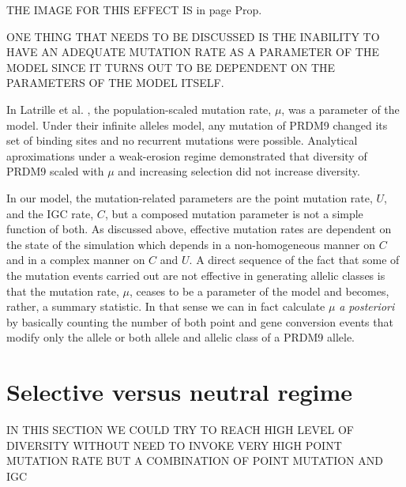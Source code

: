 \documentclass[a4paper,10pt]{article}
\begin{document}
THE IMAGE FOR THIS EFFECT IS in page Prop.

ONE THING THAT NEEDS TO BE DISCUSSED IS THE INABILITY TO HAVE AN ADEQUATE MUTATION RATE AS A PARAMETER OF THE MODEL SINCE IT TURNS OUT TO BE DEPENDENT ON THE PARAMETERS OF THE MODEL ITSELF. 

In Latrille et al. \cite{Latrille2017}, the population-scaled mutation rate, $\mu$, was a parameter of the model. Under their infinite alleles model, any mutation of PRDM9 changed its set of binding sites and no recurrent mutations were possible. Analytical aproximations under a weak-erosion regime demonstrated that diversity of PRDM9 scaled with $\mu$ and increasing selection did not increase diversity.

In our model, the mutation-related parameters are the point mutation rate, $U$, and the IGC rate, $C$, but a composed mutation parameter is not a simple function of both. As discussed above, effective mutation rates are dependent on the state of the simulation which depends in a non-homogeneous manner on $C$ and in a complex manner on $C$ and $U$. A direct sequence of the fact that some of the mutation events carried out are not effective in generating allelic classes is that the mutation rate, $\mu$, ceases to be a parameter of the model and becomes, rather, a summary statistic. In that sense we can in fact calculate $\mu$ \textit{a posteriori} by basically counting the number of both point and gene conversion events that modify only the allele or both allele and allelic class of a PRDM9 allele. 








 
 
 
 
\section{Selective versus neutral regime}
 
IN THIS SECTION WE COULD TRY TO REACH HIGH LEVEL OF DIVERSITY WITHOUT NEED TO INVOKE VERY HIGH POINT MUTATION RATE BUT A COMBINATION OF POINT MUTATION AND IGC
 
\end{document}
